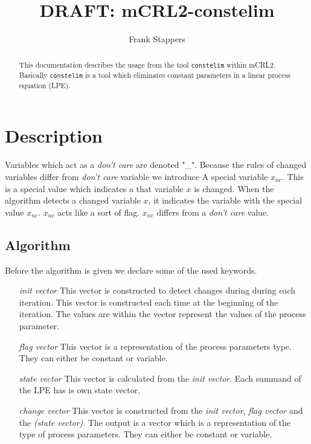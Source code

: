 \documentclass[a4paper,9pt]{article}
\title{DRAFT: mCRL2-constelim}
\author{Frank Stappers}
\begin{document}
\maketitle

\begin{abstract}
This documentation describes the usage from the tool \verb"constelim" within mCRL2. Basically \verb"constelim" is a tool which eliminates constant parameters in a linear process equation (LPE).
\end{abstract}

\section{Description} \label{sec:dec}
Variables which act as a \textit{don't care} are denoted "\_". Because the rules of changed variables differ from \textit{don't care} variable we introduce 
A special variable $x_{nc}$. This is a special value which indicates a that variable $x$ is changed. When the algorithm detects a changed variable $x$, it indicates the variable with the special value $x_{nc}$. $x_{nc}$ acts like a sort of flag. $x_{nc}$ differs from a \textit{don't care} value. 

\subsection{Algorithm}
Before the algorithm is given we declare some of the used keywords.
\begin{itemize}
\item[\textit{init vector}] This vector is constructed to detect changes during during each iteration. This vector is constructed each time at the beginning of the iteration. The values are within the vector represent the values of the process parameter.
\item[\textit{flag vector}] This vector is a representation of the process parameters type. They can either be constant or variable. 
\item[\textit{state vector}] This vector is calculated from the \textit{init vector}. Each summand of the LPE has is own state vector.
\item[\textit{change vector}] This vector is constructed from the \textit{init vector}, \textit{flag vector} and the \textit{(state vector)}. The output is a vector which is a representation of the type of process parameters. They can either be constant or variable.
\end{itemize}
\end{document}
